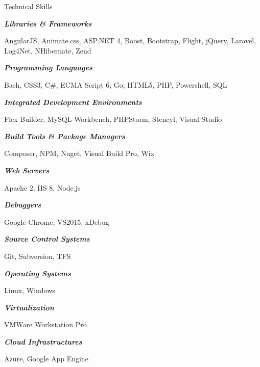 \documentclass{resume} %
\begin{document}
\begin{rSection}{Technical Skills}

\begin{rSubsection}{}{}{}{}

\item[] \textbf{\textit{Libraries \& Frameworks}}
\item AngularJS, Animate.css, ASP.NET 4, Boost, Bootstrap, Flight, jQuery, Laravel, Log4Net, NHibernate, Zend
\smallskip

\item[] \textbf{\textit{Programming Languages}}
\item Bash, CSS3, C\#, ECMA Script 6, Go, HTML5, PHP, Powershell, SQL
\vspace{3mm}

\item[] \textbf{\textit{Integrated Development Environments}}
\item Flex Builder, MySQL Workbench, PHPStorm, Stencyl, Visual Studio
\vspace{3mm}

\item[] \textbf{\textit{Build Tools \& Package Managers}}
\item Composer, NPM, Nuget, Visual Build Pro, Wix
\vspace{3mm}

\item[] \textbf{\textit{Web Servers}}
\item Apache 2, IIS 8, Node.js
\vspace{3mm}

\item[] \textbf{\textit{Debuggers}}
\item Google Chrome, VS2015, xDebug
\vspace{3mm}

\item[] \textbf{\textit{Source Control Systems}}
\item Git, Subversion, TFS
\vspace{3mm}

\item[] \textbf{\textit{Operating Systems}}
\item Linux, Windows
\vspace{3mm}

\item[] \textbf{\textit{Virtualization}}
\item VMWare Workstation Pro
\vspace{3mm}

\item[] \textbf{\textit{Cloud Infrastructures}}
\item Azure, Google App Engine

\end{rSubsection}

\end{rSection}
\end{document}
